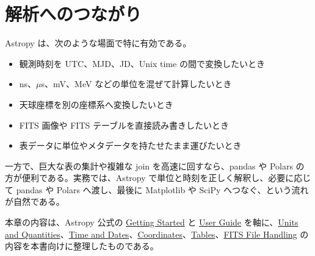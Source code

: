 \section{解析へのつながり}

Astropy は、次のような場面で特に有効である。

\begin{itemize}
\item 観測時刻を UTC、MJD、JD、Unix time の間で変換したいとき
\item ns、\(\mu\)s、mV、MeV などの単位を混ぜて計算したいとき
\item 天球座標を別の座標系へ変換したいとき
\item FITS 画像や FITS テーブルを直接読み書きしたいとき
\item 表データに単位やメタデータを持たせたまま運びたいとき
\end{itemize}

一方で、巨大な表の集計や複雑な join を高速に回すなら、pandas や Polars の方が便利である。実務では、Astropy で単位と時刻を正しく解釈し、必要に応じて pandas や Polars へ渡し、最後に Matplotlib や SciPy へつなぐ、という流れが自然である。

本章の内容は、Astropy 公式の \href{https://docs.astropy.org/en/stable/index_getting_started.html}{Getting Started} と \href{https://docs.astropy.org/en/stable/index_user_docs.html}{User Guide} を軸に、\href{https://docs.astropy.org/en/stable/units/index.html}{Units and Quantities}、\href{https://docs.astropy.org/en/stable/time/index.html}{Time and Dates}、\href{https://docs.astropy.org/en/stable/coordinates/index.html}{Coordinates}、\href{https://docs.astropy.org/en/stable/table/index.html}{Tables}、\href{https://docs.astropy.org/en/stable/io/fits/index.html}{FITS File Handling} の内容を本書向けに整理したものである。
